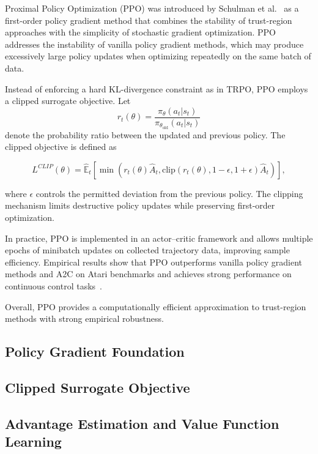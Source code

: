 \documentclass[english,bachelor]{hsluthesis}
\begin{document}
Proximal Policy Optimization (PPO) was introduced by Schulman et al.~\cite{schulman2017proximalpolicyoptimizationalgorithms} as a first-order policy gradient method that combines the stability of trust-region approaches with the simplicity of stochastic gradient optimization. PPO addresses the instability of vanilla policy gradient methods, which may produce excessively large policy updates when optimizing repeatedly on the same batch of data.

Instead of enforcing a hard KL-divergence constraint as in TRPO, PPO employs a clipped surrogate objective. Let
\begin{equation}
r_t(\theta) =
\frac{\pi_\theta(a_t|s_t)}{\pi_{\theta_{\text{old}}}(a_t|s_t)}
\end{equation}
denote the probability ratio between the updated and previous policy. The clipped objective is defined as

\begin{equation}
L^{CLIP}(\theta) =
\hat{\mathbb{E}}_t \left[
\min \left(
r_t(\theta)\hat{A}_t,
\text{clip}(r_t(\theta), 1-\epsilon, 1+\epsilon)\hat{A}_t
\right)
\right],
\end{equation}

where $\epsilon$ controls the permitted deviation from the previous policy. The clipping mechanism limits destructive policy updates while preserving first-order optimization.

In practice, PPO is implemented in an actor–critic framework and allows multiple epochs of minibatch updates on collected trajectory data, improving sample efficiency. Empirical results show that PPO outperforms vanilla policy gradient methods and A2C on Atari benchmarks and achieves strong performance on continuous control tasks~\cite{schulman2017proximalpolicyoptimizationalgorithms}.

Overall, PPO provides a computationally efficient approximation to trust-region methods with strong empirical robustness.


\subsection{Policy Gradient Foundation}
\subsection{Clipped Surrogate Objective}
\subsection{Advantage Estimation and Value Function Learning}
\end{document}
